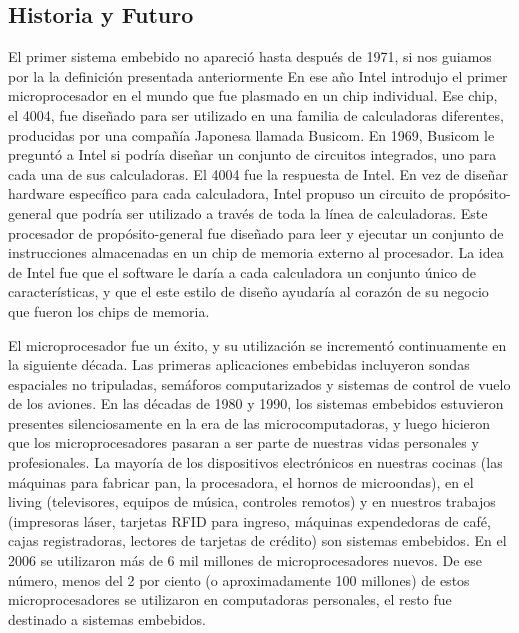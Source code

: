 \documentclass[output=paper, 
colorlinks,
citecolor=brown,
newtxmath
]{langscibook}
\begin{document}
\subsection {Historia y Futuro}

El primer sistema embebido no apareció hasta después de 1971, si nos guiamos por la
la definición presentada anteriormente En ese año Intel introdujo el primer microprocesador en el mundo
que fue plasmado en un chip individual. Ese chip, el 4004, fue diseñado para ser utilizado 
en una familia de calculadoras diferentes, producidas por una compañía Japonesa llamada Busicom.
En 1969, Busicom le preguntó a Intel si podría diseñar un conjunto de circuitos integrados,
uno para cada una de sus calculadoras. El 4004 fue la respuesta de Intel. En vez de diseñar
hardware específico para cada calculadora, Intel propuso un circuito de propósito-general
que podría ser utilizado a través de toda la línea de calculadoras. Este procesador de propósito-general
fue diseñado para leer y ejecutar un conjunto de instrucciones almacenadas en un chip de memoria
externo al procesador. La idea de Intel fue que el software le daría a cada calculadora
un conjunto único de características, y que el este estilo de diseño ayudaría al corazón de su 
negocio que fueron los chips de memoria.



El microprocesador fue un éxito, y su utilización se incrementó continuamente en la siguiente
década. Las primeras aplicaciones embebidas incluyeron sondas espaciales no tripuladas, 
semáforos computarizados y sistemas de control de vuelo de los aviones.
En las décadas de 1980 y 1990, los sistemas embebidos estuvieron presentes silenciosamente
en la era de las microcomputadoras, y luego hicieron que los microprocesadores
pasaran a ser parte de nuestras vidas personales y profesionales.
La mayoría de los dispositivos electrónicos en nuestras cocinas (las máquinas para fabricar pan, la procesadora,
el hornos de microondas), en el living (televisores, equipos de música, controles remotos) y 
en nuestros trabajos (impresoras láser, tarjetas RFID para ingreso, máquinas expendedoras de café,
cajas registradoras, lectores de tarjetas de crédito) son sistemas embebidos.
En el 2006 se utilizaron más de 6 mil millones de microprocesadores nuevos. 
De ese número, menos del 2 por ciento (o aproximadamente 100 millones) de estos microprocesadores 
se utilizaron en computadoras personales, el resto fue destinado a sistemas embebidos.
\end{document}
